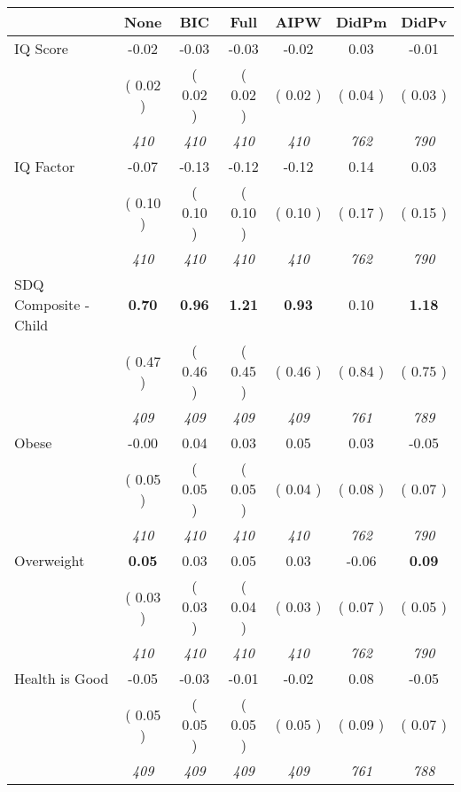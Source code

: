 \begin{tabular}{l c c c c c c}
\toprule
 & None & BIC & Full & AIPW & DidPm & DidPv \\
\midrule
IQ Score &     -0.02 &     -0.03 &     -0.03 &     -0.02 &      0.03 &     -0.01 \\
& (     0.02 ) & (     0.02 ) & (     0.02 ) & (     0.02 ) & (     0.04 ) & (     0.03 ) \\
& \textit{ 410 } & \textit{ 410 } & \textit{ 410 } & \textit{ 410 } & \textit{ 762 } & \textit{ 790 } \\
IQ Factor &     -0.07 &     -0.13 &     -0.12 &     -0.12 &      0.14 &      0.03 \\
& (     0.10 ) & (     0.10 ) & (     0.10 ) & (     0.10 ) & (     0.17 ) & (     0.15 ) \\
& \textit{ 410 } & \textit{ 410 } & \textit{ 410 } & \textit{ 410 } & \textit{ 762 } & \textit{ 790 } \\
SDQ Composite - Child & \textbf{      0.70 } & \textbf{      0.96 } & \textbf{      1.21 } & \textbf{     0.93} &      0.10 & \textbf{      1.18 } \\
& (     0.47 ) & (     0.46 ) & (     0.45 ) & (     0.46 ) & (     0.84 ) & (     0.75 ) \\
& \textit{ 409 } & \textit{ 409 } & \textit{ 409 } & \textit{ 409 } & \textit{ 761 } & \textit{ 789 } \\
Obese &     -0.00 &      0.04 &      0.03 &      0.05 &      0.03 &     -0.05 \\
& (     0.05 ) & (     0.05 ) & (     0.05 ) & (     0.04 ) & (     0.08 ) & (     0.07 ) \\
& \textit{ 410 } & \textit{ 410 } & \textit{ 410 } & \textit{ 410 } & \textit{ 762 } & \textit{ 790 } \\
Overweight & \textbf{      0.05 } &      0.03 &      0.05 &      0.03 &     -0.06 & \textbf{      0.09 } \\
& (     0.03 ) & (     0.03 ) & (     0.04 ) & (     0.03 ) & (     0.07 ) & (     0.05 ) \\
& \textit{ 410 } & \textit{ 410 } & \textit{ 410 } & \textit{ 410 } & \textit{ 762 } & \textit{ 790 } \\
Health is Good &     -0.05 &     -0.03 &     -0.01 &     -0.02 &      0.08 &     -0.05 \\
& (     0.05 ) & (     0.05 ) & (     0.05 ) & (     0.05 ) & (     0.09 ) & (     0.07 ) \\
& \textit{ 409 } & \textit{ 409 } & \textit{ 409 } & \textit{ 409 } & \textit{ 761 } & \textit{ 788 } \\

\end{tabular}
